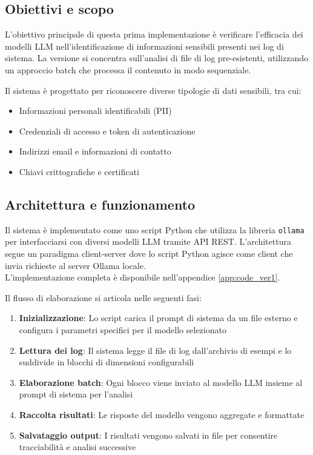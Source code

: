 \documentclass[12pt]{report}
\begin{document}
\subsection{Obiettivi e scopo}
\label{subsec:ver1_obiettivi}

L'obiettivo principale di questa prima implementazione è verificare l'efficacia dei modelli LLM nell'identificazione di informazioni sensibili presenti nei log di sistema. La versione si concentra sull'analisi di file di log pre-esistenti, utilizzando un approccio batch che processa il contenuto in modo sequenziale.

Il sistema è progettato per riconoscere diverse tipologie di dati sensibili, tra cui:
\begin{itemize}
    \item Informazioni personali identificabili (PII)
    \item Credenziali di accesso e token di autenticazione
    \item Indirizzi email e informazioni di contatto
    \item Chiavi crittografiche e certificati
\end{itemize}

\subsection{Architettura e funzionamento}
\label{subsec:ver1_architettura}

Il sistema è implementato come uno script Python che utilizza la libreria \texttt{ollama} per interfacciarsi con diversi modelli LLM tramite API REST. L'architettura segue un paradigma client-server dove lo script Python agisce come client che invia richieste al server Ollama locale. \\
L'implementazione completa è disponibile nell'appendice \ref{app:code_ver1}.

Il flusso di elaborazione si articola nelle seguenti fasi:

\begin{enumerate}
    \item \textbf{Inizializzazione}: Lo script carica il prompt di sistema da un file esterno e configura i parametri specifici per il modello selezionato
    \item \textbf{Lettura dei log}: Il sistema legge il file di log dall'archivio di esempi e lo suddivide in blocchi di dimensioni configurabili
    \item \textbf{Elaborazione batch}: Ogni blocco viene inviato al modello LLM insieme al prompt di sistema per l'analisi
    \item \textbf{Raccolta risultati}: Le risposte del modello vengono aggregate e formattate
    \item \textbf{Salvataggio output}: I risultati vengono salvati in file per consentire tracciabilità e analisi successive
\end{enumerate}
\end{document}
